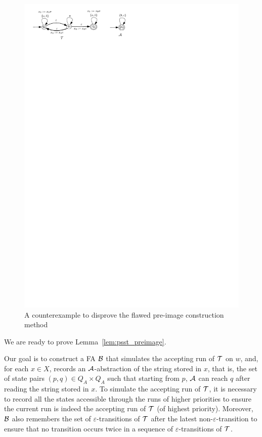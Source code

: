 {\begin{figure}[ht]
\centering
\includegraphics[scale=0.8]{pre-image-counter-example.pdf}
\caption{A counterexample to disprove the flawed pre-image construction method}
\label{fig-pre-image-count-exmp}
\end{figure}
}


We are ready to prove Lemma~\ref{lem:psst_preimage}.

  
Our goal is to construct a FA $\mathcal{B}$ that simulates the accepting run of $\mathcal{T}$ on $w$, and, for each $x \in X$, records an $\mathcal{A}$-abstraction of the string stored in $x$, that is, the set of state pairs $(p, q) \in Q_A \times Q_A$ such that starting from $p$, $\mathcal{A}$ can reach $q$ after reading the string stored in $x$. To simulate the accepting run of $\mathcal{T}$, it is necessary to record all the states accessible through the runs of higher priorities to ensure the current run is indeed the accepting run of $\mathcal{T}$ (of highest priority). Moreover, $\mathcal{B}$ also remembers the set of $\varepsilon$-transitions of $\mathcal{T}$ after the latest non-$\varepsilon$-transition to ensure that no transition occurs twice in a sequence of $\varepsilon$-transitions of $\mathcal{T}$.

